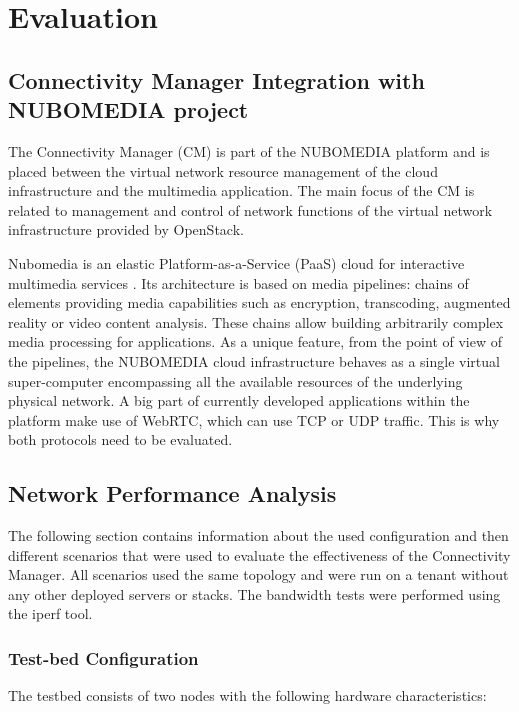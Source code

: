 \chapter{Evaluation}


\section{Connectivity Manager Integration with NUBOMEDIA project}


The Connectivity Manager (CM) is part of the NUBOMEDIA platform and is placed between the virtual network resource management of the cloud infrastructure and the
multimedia application. The main focus of the CM is related to management and control of network functions of the virtual network infrastructure provided by OpenStack.

Nubomedia is an elastic Platform-as-a-Service (PaaS) cloud for interactive multimedia services \cite{nubomedia}. Its architecture is based on media pipelines: chains of elements providing media capabilities such as encryption, transcoding, augmented reality or video content analysis. These chains allow building arbitrarily complex media processing for applications. As a unique feature, from the point of view of the pipelines, the NUBOMEDIA cloud infrastructure behaves as a single virtual super-computer encompassing all the available resources of the underlying physical network. A big part of currently developed applications within the platform make use of WebRTC, which can use TCP or UDP traffic. This is why both protocols need to be evaluated.

\section{Network Performance Analysis}

The following section contains information about the used configuration and then different scenarios that were used to evaluate the effectiveness of the Connectivity Manager. All scenarios used the same topology and were run on a tenant without any other deployed servers or stacks. The bandwidth tests were performed using the iperf tool.

\subsection{Test-bed Configuration}

The testbed consists of two nodes with the following hardware characteristics:



